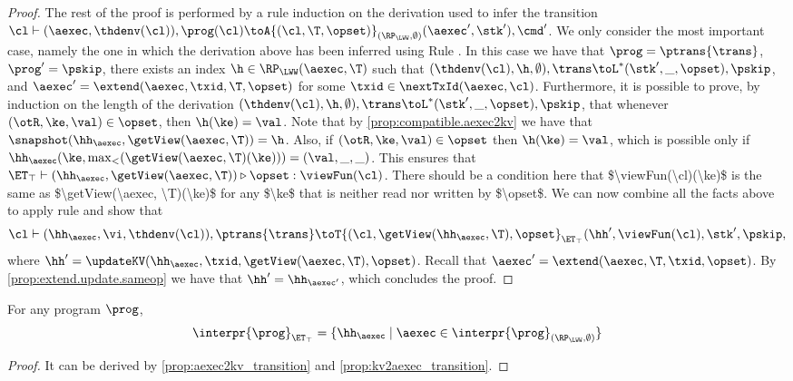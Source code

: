 \begin{proof}
The rest of the proof is performed by a rule induction on the derivation used to infer 
the transition $\cl \vdash (\aexec, \thdenv(\cl)), \prog(\cl) \toA{(\cl, \T, \opset)}_{(\RP_{\LWW}, \emptyset)} (\aexec', \stk'), \cmd'$. 
We only consider the most important case, namely the one in which the derivation above 
has been inferred using Rule . In this case we have that 
$\prog = \ptrans{\trans}$, $\prog' = \pskip$, there exists an index $\h \in \RP_{\LWW}(\aexec, \T)$ such that 
$(\thdenv(\cl), \h, \emptyset), \trans \toL^{\ast} (\stk', \_, \opset), \pskip$, and $\aexec' = 
\extend(\aexec, \txid, \T, \opset)$ for some $\txid \in \nextTxId(\aexec, \cl)$. 
Furthermore, it is possible to prove, by induction on the length of the derivation $(\thdenv(\cl), \h, \emptyset), \trans \toL^{\ast} (\stk', \_, \opset), \pskip$, 
that whenever $(\otR, \ke, \val) \in \opset$, then $\h(\ke) = \val$.
Note that by \cref{prop:compatible.aexec2kv} we have that $\snapshot(\hh_{\aexec}, \getView(\aexec, \T)) = 
\h$. Also, if $(\otR,\ke, \val) \in \opset$ then $\h(\ke) = \val$, which is possible only if  
$\hh_{\aexec}(\ke, \max_{<}(\getView(\aexec, \T)(\ke))) = (\val, \_, \_)$. This ensures 
that $\ET_{\top} \vdash (\hh_{\aexec}, \getView(\aexec, \T)) \triangleright \opset: \viewFun(\cl)$. 
\ac{There should be a condition here that $\viewFun(\cl)(\ke)$ is the same as $\getView(\aexec, \T)(\ke)$ 
for any $\ke$ that is neither read nor written by $\opset$.} 
We can now combine all the facts above to apply rule  and show that 
\[
\cl \vdash (\hh_{\aexec}, \vi, \thdenv(\cl)), \ptrans{\trans} \toT{(\cl, \getView(\hh_{\aexec}, \T), \opset}_{\ET_{\top}} 
(\hh', \viewFun(\cl), \stk', \pskip, 
\] 
where $\hh' = \updateKV(\hh_{\aexec}, \txid, \getView(\aexec, \T), \opset)$. 
Recall that $\aexec' = \extend(\aexec, \T, \txid, \opset)$. 
By \cref{prop:extend.update.sameop} we have that $\hh' = \hh_{\aexec'}$, 
which concludes the proof.
\end{proof}

\begin{corollary}
For any program $\prog$, 
\[
\interpr{\prog}_{\ET_{\top}} = \{\hh_{\aexec} \mid \aexec \in \interpr{\prog}_{(\RP_{\LWW}, \emptyset)}\}
\]
\end{corollary}
\begin{proof}
    It can be derived by \cref{prop:aexec2kv_transition} and \cref{prop:kv2aexec_transition}.
\end{proof}


